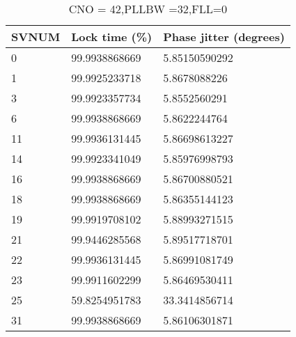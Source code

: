 \begin{table}[!htb]
\centering
\begin{tabular}{|l|l|l|}
\hline
\rowcolor[HTML]{C0C0C0} 
SVNUM & Lock time (\%) & Phase jitter (degrees) \\ \hline
0     & 99.9938868669  & 5.85150590292          \\ \hline
\rowcolor[HTML]{EFEFEF} 
1     & 99.9925233718  & 5.8678088226           \\ \hline
3     & 99.9923357734  & 5.8552560291           \\ \hline
\rowcolor[HTML]{EFEFEF} 
6     & 99.9938868669  & 5.8622244764           \\ \hline
11    & 99.9936131445  & 5.86698613227          \\ \hline
\rowcolor[HTML]{EFEFEF} 
14    & 99.9923341049  & 5.85976998793          \\ \hline
16    & 99.9938868669  & 5.86700880521          \\ \hline
\rowcolor[HTML]{EFEFEF} 
18    & 99.9938868669  & 5.86355144123          \\ \hline
19    & 99.9919708102  & 5.88993271515          \\ \hline
\rowcolor[HTML]{EFEFEF} 
21    & 99.9446285568  & 5.89517718701          \\ \hline
22    & 99.9936131445  & 5.86991081749          \\ \hline
\rowcolor[HTML]{EFEFEF} 
23    & 99.9911602299  & 5.86469530411          \\ \hline
25    & 59.8254951783  & 33.3414856714          \\ \hline
\rowcolor[HTML]{EFEFEF} 
31    & 99.9938868669  & 5.86106301871          \\ \hline
\end{tabular}
\caption{CNO = 42,PLLBW =32,FLL=0}
\label{my-label}
\end{table}

